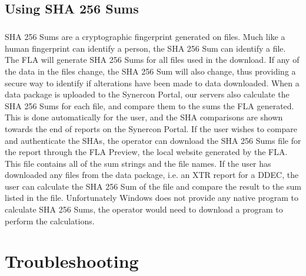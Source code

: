 \documentclass[11pt, oneside]{book}
\begin{document}
\section{Using SHA 256 Sums}
\label{subsec:using_shas}
\paragraph{  }
SHA 256 Sums are a cryptographic fingerprint generated on files. Much like a human fingerprint can identify a person, the SHA 256 Sum can identify a file. The FLA will generate SHA 256 Sums for all files used in the download. If any of the data in the files change, the SHA 256 Sum will also change, thus providing a secure way to identify if alterations have been made to data downloaded. When a data package is uploaded to the Synercon Portal, our servers also calculate the SHA 256 Sums for each file, and compare them to the sums the FLA generated. This is done automatically for the user, and the SHA comparisons are shown towards the end of reports on the Synercon Portal. If the user wishes to compare and authenticate the SHAs, the operator can download the SHA 256 Sums file for the report through the FLA Preview, the local website generated by the FLA. This file contains all of the sum strings and the file names. If the user has downloaded any files from the data package, i.e. an XTR report for a DDEC, the user can calculate the SHA 256 Sum of the file and compare the result to the sum listed in the file. Unfortunately Windows does not provide any native program to calculate SHA 256 Sums, the operator would need to download a program to perform the calculations.

\chapter{Troubleshooting}
\end{document}
